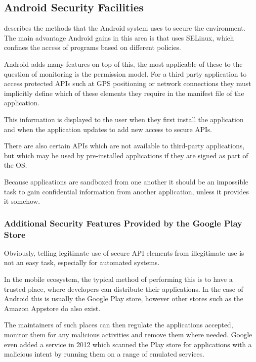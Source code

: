 \documentclass[12pt, a4paper]{article}
\begin{document}
\subsection{Android Security Facilities}

\cite{google2013security} describes the methods that the Android system uses to
secure the environment. The main advantage Android gains in this area is that
uses \gls{SELinux}, which confines the access of programs based on different
policies.

Android adds many features on top of this, the most applicable of these to the
question of monitoring is the permission model. For a third party application
to access protected APIs such at GPS positioning or network connections they
must implicitly define which of these elements they require in the manifest
file of the application.

This information is displayed to the user when they first install the
application and when the application updates to add new access to secure APIs.

There are also certain APIs which are not available to third-party 
applications, but which may be used by pre-installed applications if they are
signed as part of the OS.

Because applications are sandboxed from one another it should be an impossible
task to gain confidential information from another application, unless it
provides it somehow.

\subsubsection{Additional Security Features Provided by the Google Play Store}

Obviously, telling legitimate use of secure API elements from illegitimate use
is not an easy task, especially for automated systems.

In the mobile ecosystem, the typical method of performing this is to have a
trusted place, where developers can distribute their applications. In the case
of Android this is usually the Google Play store, however other stores such as
the Amazon Appstore do also exist.

The maintainers of such places can then regulate the applications accepted,
monitor them for any malicious activities and remove them where needed. 
Google even added a service in 2012 which scanned the Play store for
applications with a malicious intent by running them on a range of emulated
services\cite{lockheimer2012android}.
\end{document}
